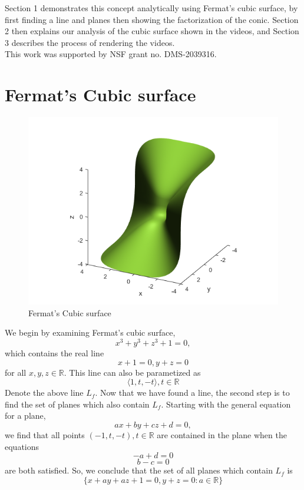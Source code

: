 \documentclass{article}
\newcommand{\R}{{\mathbb R}}
\begin{document}
	Section 1 demonstrates this concept analytically using Fermat's cubic surface, by first finding a line and planes then showing the factorization of the conic. Section 2 then explains our analysis of the cubic surface shown in the videos, and Section 3 describes the process of rendering the videos. \\
	
	This work was supported by NSF grant no. DMS-2039316.

\iftrue
\newpage
\section{Fermat's Cubic surface}
	\begin{figure}[h!]
		\centering
		\includegraphics[scale=0.75]{fermat_cubic_image.png}
		\caption{Fermat's Cubic surface}
		\label{fermat_fig}
	\end{figure}
	We begin by examining Fermat's cubic surface,
	\[ x^3 + y^3 + z^3 + 1 = 0, \]
	which contains the real line 
	\[x + 1 = 0, y + z = 0 \]
	for all $x, y, z \in \R$. This line can also be parametized as 
	\[ \langle1, t, -t \rangle, t \in \R \]
	Denote the above line $L_f$. Now that we have found a line, the second step is to find the set of planes which also contain $L_f$. Starting with the general equation for a plane, 
	\[ ax + by + cz + d = 0, \]
	we find that all points $(-1, t, -t), t \in \R$ are contained in the plane when the equations
	\[ -a + d = 0 \]
	\[ b - c = 0 \]
	are both satisfied. So, we conclude that the set of all planes which contain $L_f$ is 
	\[ \{ x + ay + az + 1 = 0, y + z = 0 : a \in \R \} \]
	
\end{document}
